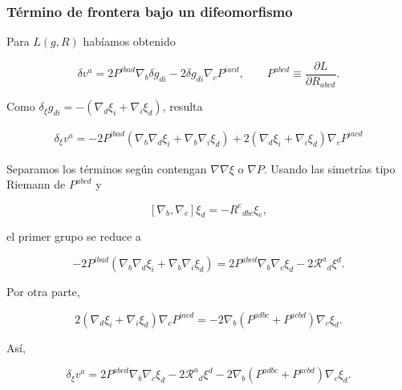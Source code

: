 \documentclass{beamer}
\newcommand{\Rcal}{\mathcal{R}}
\begin{document}
\begin{frame}[label=nav-frame-043]
	\frametitle{Término de frontera bajo un difeomorfismo}
	\scriptsize

	Para \(L(g,R)\) habíamos obtenido

	\[
	\delta v^a
	=
	2P^{ibad}\nabla_b\delta g_{di}
	-
	2\delta g_{di}\nabla_cP^{iacd},
	\qquad
	P^{abcd}\equiv\frac{\partial L}{\partial R_{abcd}}.
	\]

	Como $\delta_\xi g_{di} = -\left(\nabla_d\xi_i+\nabla_i\xi_d\right)$, resulta

	\[
	\begin{aligned}
		\delta_\xi v^a
		=-2P^{ibad}
		\left(
		\nabla_b\nabla_d\xi_i
		+
		\nabla_b\nabla_i\xi_d
		\right)+
		2\left(
		\nabla_d\xi_i+\nabla_i\xi_d
		\right)
		\nabla_cP^{iacd}
	\end{aligned}
	\]

	Separamos los términos según contengan
	\(\nabla\nabla\xi\) o \(\nabla P\). Usando las simetrías
	tipo Riemann de \(P^{abcd}\) y

	\[
	[\nabla_b,\nabla_c]\xi_d
	=
	-R^{e}{}_{dbc}\xi_e,
	\]

	el primer grupo se reduce a

	\[
	-2P^{ibad}
	\left(
	\nabla_b\nabla_d\xi_i+\nabla_b\nabla_i\xi_d
	\right)
	=
	2P^{abcd}\nabla_b\nabla_c\xi_d
	-
	2\Rcal^a{}_{d}\xi^d.
	\]

	Por otra parte,

	\[
	2(\nabla_d\xi_i+\nabla_i\xi_d)\nabla_cP^{iacd}
	=
	-2\nabla_b
	\left(
	P^{adbc}+P^{acbd}
	\right)\nabla_c\xi_d.
	\]

	Así,

	\begin{equation}
		\boxed{
			\delta_\xi v^a
			=
			2P^{abcd}\nabla_b\nabla_c\xi_d
			-
			2\Rcal^a{}_d\xi^d
			-
			2\nabla_b(P^{adbc}+P^{acbd})\nabla_c\xi_d.
		}
		\label{eq:delta-v-noether-pad}
	\end{equation}

\end{frame}
\end{document}
